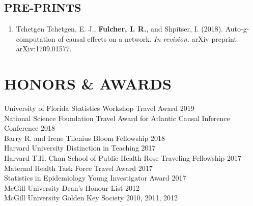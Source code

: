\documentclass[12pt]{article}
\begin{document}
\subsection*{\textbf{PRE-PRINTS}}

\begin{enumerate}
	\item Tchetgen Tchetgen, E. J., \textbf{Fulcher, I. R.}, and Shpitser, I. (2018). Auto-g-computation of causal effects on a network. \textit{In revision}. arXiv preprint arXiv:1709.01577. 
\end{enumerate}






\section*{\textbf{{\large H}{ONORS} {\large \&} {\large A}{WARDS}}}
University of Florida Statistics Workshop Travel Award \hfill \hfill 2019 \\
National Science Foundation Travel Award for Atlantic Causal Inference Conference \hfill \hfill	2018 \\
Barry R. and Irene Tilenius Bloom Fellowship \hfill \hfill	2018 \\
Harvard University Distinction in Teaching \hfill \hfill 2017 \\
Harvard T.H. Chan School of Public Health Rose Traveling Fellowship \hfill \hfill	2017 \\
Maternal Health Task Force Travel Award \hfill \hfill	2017 \\
Statistics in Epidemiology Young Investigator Award  \hfill \hfill	2017 \\
McGill University Dean's Honour List  \hfill \hfill	2012 \\
McGill University Golden Key Society  \hfill \hfill2010, 2011, 2012 
\end{document}
